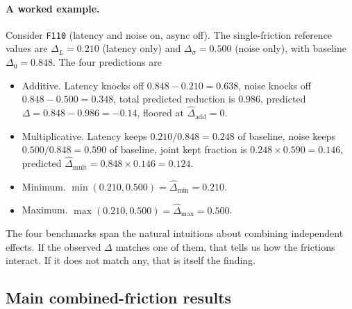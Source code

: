 \paragraph{A worked example.}
Consider \texttt{F110} (latency and noise on, async off). The single-friction reference values are $\Delta_L = 0.210$ (latency only) and $\Delta_\sigma = 0.500$ (noise only), with baseline $\Delta_0 = 0.848$. The four predictions are
\begin{itemize}[topsep=2pt, itemsep=2pt]
    \item Additive. Latency knocks off $0.848 - 0.210 = 0.638$, noise knocks off $0.848 - 0.500 = 0.348$, total predicted reduction is $0.986$, predicted $\Delta = 0.848 - 0.986 = -0.14$, floored at $\widehat\Delta_{\mathrm{add}} = 0$.
    \item Multiplicative. Latency keeps $0.210 / 0.848 = 0.248$ of baseline, noise keeps $0.500 / 0.848 = 0.590$ of baseline, joint kept fraction is $0.248 \times 0.590 = 0.146$, predicted $\widehat\Delta_{\mathrm{mult}} = 0.848 \times 0.146 = 0.124$.
    \item Minimum. $\min(0.210, 0.500) = \widehat\Delta_{\mathrm{min}} = 0.210$.
    \item Maximum. $\max(0.210, 0.500) = \widehat\Delta_{\mathrm{max}} = 0.500$.
\end{itemize}
The four benchmarks span the natural intuitions about combining independent effects. If the observed $\Delta$ matches one of them, that tells us how the frictions interact. If it does not match any, that is itself the finding.

\subsection{Main combined-friction results}
\label{sec:factorial-headline}


